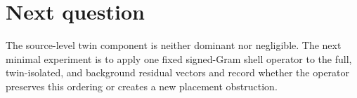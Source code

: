 \documentclass[10pt]{article}
\begin{document}
\section{Next question}

The source-level twin component is neither dominant nor negligible.  The next
minimal experiment is to apply one fixed signed-Gram shell operator to the
full, twin-isolated, and background residual vectors and record whether the
operator preserves this ordering or creates a new placement obstruction.
\end{document}
